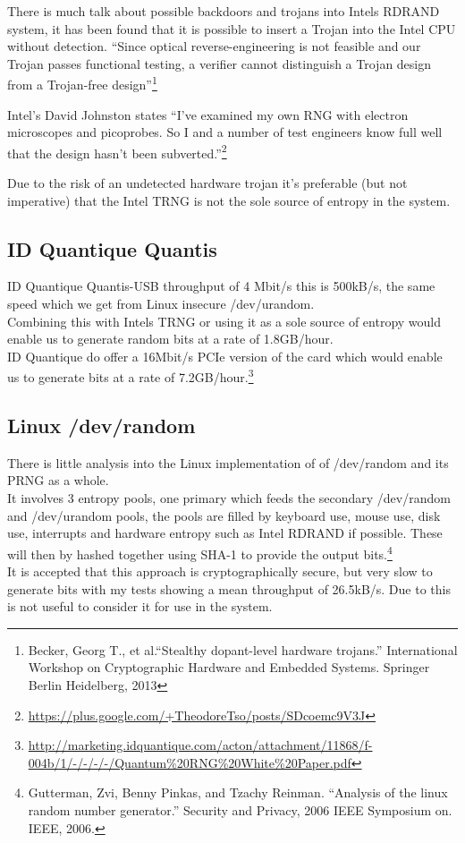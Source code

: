 \documentclass{paper}
\begin{document}
			There is much talk about possible backdoors and trojans into Intels RDRAND system, it has been found that it is possible to insert a 
			Trojan into the Intel CPU without detection. 
			``Since optical reverse-engineering is not feasible and our Trojan passes functional testing, a verifier cannot distinguish a Trojan design from a Trojan-free design''\footnote{Becker, Georg T., et al.``Stealthy dopant-level hardware trojans.'' International Workshop on Cryptographic Hardware and Embedded Systems. Springer Berlin Heidelberg, 2013}
				
			Intel's David Johnston states ``I’ve examined my own RNG with electron microscopes and picoprobes. So I and a number of test engineers know full well that the design hasn’t been subverted.''\footnote{\url{https://plus.google.com/+TheodoreTso/posts/SDcoemc9V3J}}
				
			Due to the risk of an undetected hardware trojan it's preferable (but not imperative) that the Intel TRNG is not the sole source of entropy in the system.
			
		\subsection{ID Quantique Quantis}
			ID Quantique Quantis-USB throughput of 4 Mbit/s this is 500kB/s, the same speed which we get from Linux insecure /dev/urandom.\\
			Combining this with Intels TRNG or using it as a sole source of entropy would enable us to generate random bits at a rate of 1.8GB/hour. \\
			ID Quantique do offer a 16Mbit/s PCIe version of the card which would enable us to generate bits at a rate of 7.2GB/hour.\footnote{\url{http://marketing.idquantique.com/acton/attachment/11868/f-004b/1/-/-/-/-/Quantum\%20RNG\%20White\%20Paper.pdf}}
			
			
		\subsection{Linux /dev/random}
			There is little analysis into the Linux implementation of of /dev/random and its PRNG as a whole.\\
			It involves 3 entropy pools, one primary which feeds the secondary /dev/random and /dev/urandom pools, the pools are filled by keyboard use, mouse use, disk use, interrupts and hardware entropy such as Intel RDRAND if possible. 
			These will then by hashed together using SHA-1 to provide the output bits.\footnote{Gutterman, Zvi, Benny Pinkas, and Tzachy Reinman. ``Analysis of the linux random number generator.'' Security and Privacy, 2006 IEEE Symposium on. IEEE, 2006.} \\
			It is accepted that this approach is cryptographically secure, but very slow to generate bits with my tests showing a mean throughput of 26.5kB/s.  Due to this is not useful to consider it for use in the system.
			
\end{document}
